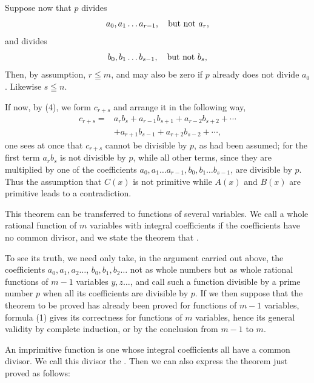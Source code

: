 
Suppose now that $p$ divides
\[
 a_0,a_1\ldots a_{r-1},\quad \hbox{but not }a_r,
\]
and divides
\[
 b_0,b_1\ldots b_{s-1},\quad \hbox{but not }b_s,
\]
Then, by assumption, $r\leqq m$, and may also be zero if $p$ already
does not divide $a_0$. Likewise $s\leqq n$.

If now, by (4), we form $c_{r+s}$ and arrange it in the following way,
\begin{equation}
\begin{aligned}
 c_{r+s}={}&a_rb_s+a_{r-1}b_{s+1}+a_{r-2}b_{s+2}+\cdots\\
            &+a_{r+1}b_{s-1}+a_{r+2}b_{s-2}+\cdots,
\end{aligned}
\tag{1}
\end{equation}
one sees at once that $c_{r+s}$ cannot be divisible by $p$, as had
been assumed; for the first term $a_rb_s$ is not divisible by $p$,
while all other terms, since they are multiplied by one of the
coefficients $a_0,a_1\ldots a_{r-1},b_0,b_1\ldots b_{s-1}$, are
divisible by $p$. Thus the assumption that $C(x)$ is not primitive
while $A(x)$ and $B(x)$ are primitive leads to a contradiction.

This theorem can be transferred to functions of several variables. We
call a whole rational function of $m$ variables with integral
coefficients  if the coefficients have
no common divisor, and we state the theorem that .

To see its truth, we need only take, in the argument carried out above,
the coefficients $a_0,a_1,a_2\ldots$, $b_0,b_1,b_2\ldots$ not as whole
numbers but as whole rational functions of $m-1$ variables
$y,z\ldots$, and call such a function divisible by a prime number $p$
when all its coefficients are divisible by $p$. If we then suppose
that the theorem to be proved has already been proved for functions of
$m-1$ variables, formula (1) gives its correctness for functions of
$m$ variables, hence its general validity by complete induction, or by
the conclusion from $m-1$ to $m$.

An imprimitive function is one whose integral coefficients all have a
common divisor. We call this divisor the . Then we can also express the theorem just proved as follows:
